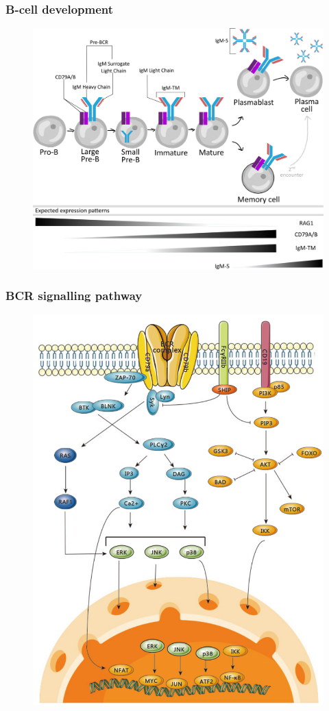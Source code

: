 \documentclass[presentation]{beamer}
\newlength{\slideheight}
\begin{document}
\begin{frame}
\frametitle{B-cell development}
\begin{figure}
\includegraphics[height=0.95\slideheight]{figs/png/b-cell-development}
\end{figure}
\end{frame}

\begin{frame}
\frametitle{BCR signalling pathway}
\begin{figure}
\includegraphics[height=\slideheight]{figs/png/bcr-signalling}
\end{figure}
\end{frame}
\end{document}
